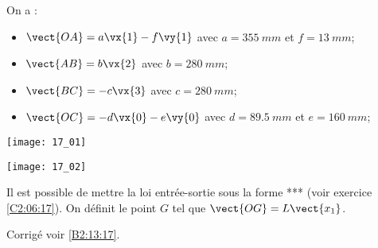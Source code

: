 \normalfalse \difficilefalse \tdifficiletrue
\correctionfalse


\setcounter{question}{0}
\ifcorrection
\else
{}
\fi

\ifprof
\else
On a : 
\begin{itemize}
\item $\vect{OA} = a \vx{1}-f \vy{1}$ avec $a=\SI{355}{mm}$ et $f=\SI{13}{mm}$;
\item $\vect{AB} = b \vx{2}$ avec $b=\SI{280}{mm}$;
\item $\vect{BC} = -c \vx{3}$ avec $c=\SI{280}{mm}$;
\item $\vect{OC} = -d \vx{0}-e\vy{0}$ avec $d=\SI{89,5}{mm}$ et $e=\SI{160}{mm}$;
\end{itemize}

\begin{center}
\texttt{[image: 17\_01]}

\texttt{[image: 17\_02]}
\end{center}
\fi
Il est possible de mettre la loi entrée-sortie sous la forme *** (voir exercice \ref{C2:06:17}).
On définit le point $G$ tel que $\vect{OG}=L\vect{x_1}$.

\ifprof
\else
\fi

\ifprof
\else
\fi

\ifprof
\else
\begin{flushright}
\footnotesize{Corrigé  voir \ref{B2:13:17}.}
\end{flushright}%
\fi